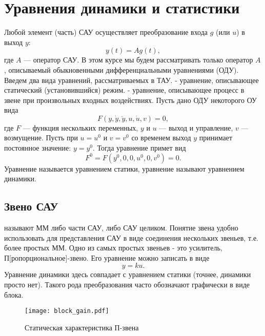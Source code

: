 \documentclass[../../TAU.tex]{subfiles}
\begin{document}
\section{Уравнения динамики и статистики} %
    Любой элемент (часть) САУ осуществляет преобразование входа 
    $g$ (или $u$) в выход $y$:
    \begin{equation}
        y(t) = A g(t),
    \end{equation}
    где $A$ --- оператор САУ. В этом курсе мы будем рассматривать только оператор $A$, описываемый обыкновенными дифференциальными уравнениями (ОДУ). Введем два вида уравнений, рассматриваемых в ТАУ.
     - уравнение, описывающее статический (установившийся) режим.
     - уравнение, описывающее процесс в звене при произвольных входных воздействиях.
    Пусть дано ОДУ некоторого ОУ вида
    \begin{equation}\label{EQ_DYNAMIC}
        F(y,\dot y, \ddot y, u, \dot u, v) = 0,
    \end{equation}
    где $F$ --- функция нескольких переменных, $y$ и $u$ --- выход и управление, $v$ --- возмущение.
    Пусть при $u=u^0$ и $v=v^0$ со временем выход $y$ принимает постоянное значение: $y=y^0$. Тогда уравнение 
    примет вид
    \begin{equation}\label{EQ_STATIC}
        F^0=F(y^0, 0, 0, u^0, 0, v^0) = 0.
    \end{equation}
    Уравнение 
    называется уравнением статики, уравнение 
    называют уравнением динамики.
\subsection{Звено САУ} %
     называют ММ либо части САУ, либо САУ целиком. Понятие звена удобно использовать для представления САУ в виде соединения нескольких звеньев, т.е. более простых ММ.
    Одно из самых простых звеньев - это усилитель, П[ропорциональное]-звено. Его уравнение можно записать в виде
    \begin{equation}
        y = ku.
    \end{equation}
    Уравнение динамики здесь совпадает с уравнением статики (точнее, динамики просто нет). Такого рода преобразования часто обозначают графически в виде блока.
    \begin{figure}[h]
        \centering
        \texttt{[image: block\_gain.pdf]}
        \caption{Статическая характеристика П-звена}
        \centering
    \end{figure}
\end{document}
